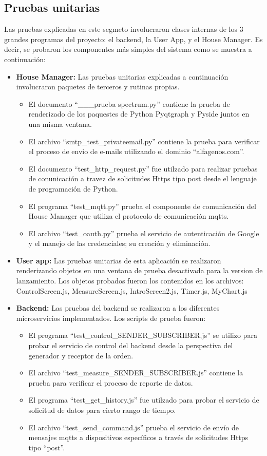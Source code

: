 
\subsection{Pruebas unitarias}
Las pruebas explicadas en este segmeto involucraron clases internas de los 3 grandes programas del proyecto: el backend, la User App, y el House Manager. Es decir, se probaron los componentes más simples del sistema como se muestra a continuación:

\begin{itemize}
	\item \textbf{House Manager:} Las pruebas unitarias explicadas a continuación involucraron paquetes de terceros y rutinas propias.
	\begin{itemize}
		\item El documento ``\_\_\_prueba spectrum.py'' contiene la prueba de renderizado de los paquestes de Python Pyqtgraph y Pyside juntos en una misma ventana.
		\item El archivo ``smtp\_test\_privateemail.py'' contiene la prueba para verificar el proceso de envio de e-mails utilizando el dominio ``alfagenos.com''.
		\item El documento ``test\_http\_request.py'' fue utilzado para realizar pruebas de conunicación a travez de solicitudes Https tipo post desde el lenguaje de programación de Python.
		\item El programa ``test\_mqtt.py'' prueba el componente de comunicación del House Manager que utiliza el protocolo de comunicación mqtts.
		\item El archivo ``test\_oauth.py'' prueba el servicio de autenticación de Google y el manejo de las credenciales; su creación y eliminación.
	\end{itemize}
	\item \textbf{User app:} Las pruebas unitarias de esta aplicación se realizaron renderizando objetos en una ventana de prueba desactivada para la version de lanzamiento. Los objetos probados fueron los contenidos en los archivos: ControlScreen.js, MeasureScreen.js, IntroScreen2.js, Timer.js, MyChart.js
	\item \textbf{Backend:} Las pruebas del backend se realizaron a los diferentes microservicios implementados. Los scripts de prueba fueron:
	\begin{itemize}
		\item El programa ``test\_control\_SENDER\_SUBSCRIBER.js'' se utilizo para probar el servicio de control del backend desde la perspectiva del generador y receptor de la orden.
		\item El archivo ``test\_measure\_SENDER\_SUBSCRIBER.js'' contiene la prueba para verificar el proceso de reporte de datos.
		\item El programa ``test\_get\_history.js'' fue utilzado para probar el servicio de solicitud de datos para cierto rango de tiempo.
		\item El archivo ``test\_send\_command.js'' prueba el servicio de envío de mensajes mqtts a dispositivos específicos a través de solicitudes Https tipo ``post''.
	\end{itemize}
\end{itemize}

